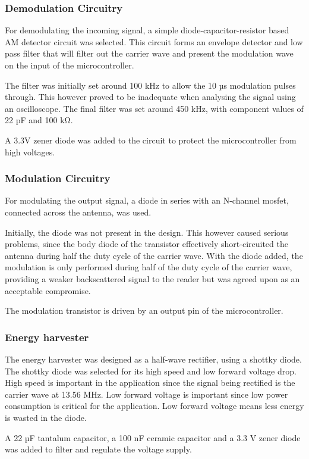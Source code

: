 \subsubsection{Demodulation Circuitry}
For demodulating the incoming signal, a simple diode-capacitor-resistor based AM detector circuit was selected.
This circuit forms an envelope detector and low pass filter that will filter out the carrier wave and present the modulation wave on the input of the microcontroller.

The filter was initially set around 100 kHz to allow the 10 µs modulation pulses\cite{rfid-iso} through.
This however proved to be inadequate when analysing the signal using an oscilloscope.
The final filter was set around 450 kHz, with component values of 22 pF and 100 kΩ.

A 3.3V zener diode was added to the circuit to protect the microcontroller from high voltages.

\subsubsection{Modulation Circuitry}
For modulating the output signal, a diode in series with an N-channel mosfet, connected across the antenna, was used.

Initially, the diode was not present in the design.
This however caused serious problems, since the body diode of the transistor effectively short-circuited the antenna during half the duty cycle of the carrier wave.
With the diode added, the modulation is only performed during half of the duty cycle of the carrier wave, providing a weaker backscattered signal to the reader but was agreed upon as an acceptable compromise.

The modulation transistor is driven by an output pin of the microcontroller.

\subsubsection{Energy harvester}
The energy harvester was designed as a half-wave rectifier, using a shottky diode.
The shottky diode was selected for its high speed and low forward voltage drop.
High speed is important in the application since the signal being rectified is the carrier wave at 13.56 MHz.
Low forward voltage is important since low power consumption is critical for the application.
Low forward voltage means less energy is wasted in the diode.

A 22 µF tantalum capacitor, a 100 nF ceramic capacitor and a 3.3 V zener diode was added to filter and regulate the voltage supply.

